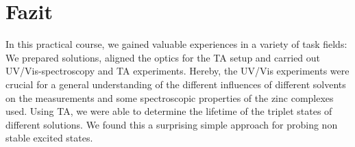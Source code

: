 

\chapter{Fazit}
\label{chap:fazit}
In this practical course, we gained valuable experiences in a variety of task fields: We prepared solutions, aligned the optics for the TA setup and carried out UV/Vis-spectroscopy and TA experiments. Hereby, the UV/Vis experiments were crucial for a general understanding of the different influences of different solvents on the measurements and some spectroscopic properties of the zinc complexes used. Using TA, we were able to determine the lifetime of the triplet states of different solutions. We found this a surprising simple approach for probing non stable excited states.


